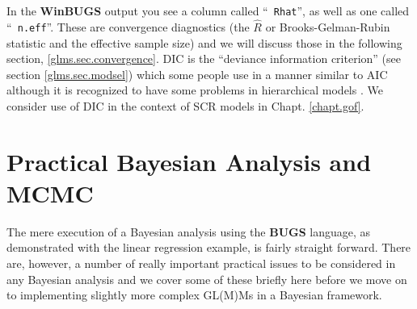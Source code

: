 


 In the {\bf WinBUGS} output you see a column called ``\mbox{\tt
   Rhat}'', as well as one called ``\mbox{\tt
   n.eff}''. These are convergence diagnostics (the $\hat{R}$ or Brooks-Gelman-Rubin statistic and the effective sample size) and we will discuss those in the following section, \ref{glms.sec.convergence}. DIC is the
``deviance information criterion'' \citep{spiegelhalter_etal:2002}
(see section \ref{glms.sec.modsel})
 which
some people use in a manner similar to AIC although it is recognized
to have some problems in hierarchical models \citep{millar:2009}. We
consider use of DIC in the context of SCR models in Chapt. \ref{chapt.gof}.





\section{Practical Bayesian Analysis and MCMC}
\label{GLMM.sec.practical}

The mere execution of a Bayesian analysis using the {\bf BUGS} language, as demonstrated with the linear regression example, is fairly straight forward. There are, however, a number of really important practical issues to be
considered in any Bayesian analysis and we cover some of these briefly
here before we move on to implementing slightly more complex GL(M)Ms in a Bayesian framework.

